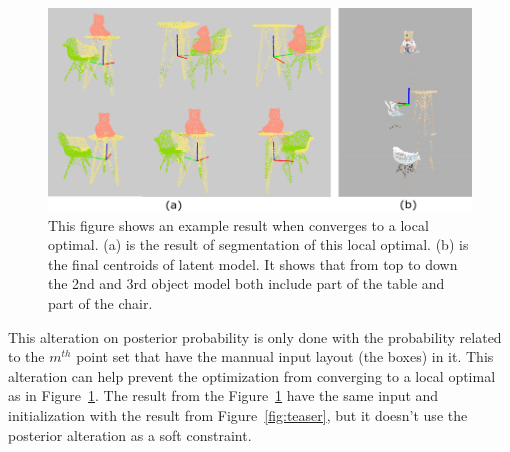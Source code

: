 \begin{figure}[htb]
	\centering
	\includegraphics[width=\linewidth]{images/localoptimal/localoptimal}
	\caption{\label{fig:localoptimal}This figure shows an example result when converges to a local optimal. (a) is the result of segmentation of this local optimal. (b) is the final centroids of latent model. It shows that from top to down the 2nd and 3rd object model both include part of the table and part of the chair.}
\end{figure}
This alteration on posterior probability is only done with the probability related to the $m^{th}$ point set that have the mannual input layout (the boxes) in it. This alteration can help prevent the optimization from converging to a local optimal as in Figure~\ref{fig:localoptimal}. The result from the Figure~\ref{fig:localoptimal} have the same input and initialization with the result from Figure~\ref{fig:teaser}, but it doesn't use the posterior alteration as a soft constraint.

